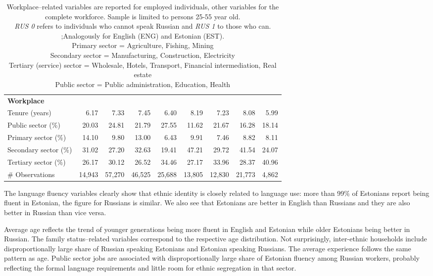 \documentclass[12pt, a4paper]{article}
\begin{document}
\begin{table}
\begin{tabular}{l|rrrr|rrrr}
		\textbf{Workplace}          &        &        &        &        &        &        &        &        \\
		Tenure (years)              & 6.17   & 7.33   & 7.45   & 6.40   & 8.19   & 7.23   & 8.08   & 5.99   \\
		Public sector (\%)          & 20.03  & 24.81  & 21.79  & 27.55  & 11.62  & 21.67  & 16.28  & 18.14  \\
		Primary sector (\%)         & 14.10  & 9.80   & 13.00  & 6.43   & 9.91   & 7.46   & 8.82   & 8.11   \\
		Secondary sector (\%)       & 31.02  & 27.20  & 32.63  & 19.41  & 47.21  & 29.72  & 41.54  & 24.07  \\
		Tertiary sector (\%)        & 26.17  & 30.12  & 26.52  & 34.46  & 27.17  & 33.96  & 28.37  & 40.96  \\
		\# Observations             & 14,943 & 57,270 & 46,525 & 25,688 & 13,805 & 12,830 & 21,773 & 4,862  \\ \bottomrule
	\end{tabular}%
	\label{tab:descriptive}%
                                                          
                                                      
	\caption*{\small
				Workplace--related variables are reported for employed individuals,
			other variables for the complete workforce.  Sample is limited to persons
			25-55 year old.\\
			\emph{RUS 0} refers to individuals who cannot speak Russian and
			\emph{RUS 1} to those who can. ;Analogously for   
			English
			(ENG) and
			Estonian (EST).\\
			Primary sector = Agriculture,
			Fishing, Mining \\ Secondary sector = Manufacturing,
			Construction, Electricity \\ Tertiary (service) sector =
			Wholesale, Hotels, Transport, Financial intermediation, Real
			estate \\ Public sector = Public administration, Education,
			Health
		}
\end{table}%

The language fluency variables clearly show that ethnic identity is
closely related to language use: more than 99\% of Estonians report
being fluent in Estonian, the figure for Russians is similar. We
also see that Estonians are better in English than Russians and they
are also better in Russian than vice versa.

Average age reflects the trend of younger generations
being more fluent in English and Estonian while older Estonians being
better in Russian. The family status--related variables correspond to the
respective age distribution. Not surprisingly, inter-ethnic
households include disproportionally large share of Russian speaking
Estonians and Estonian speaking Russians.
The average experience follows the same pattern as age.
Public sector jobs are associated with disproportionally large share of
Estonian fluency among Russian workers, probably reflecting the formal
language requirements and little room for ethnic segregation in that
sector.
\end{document}
